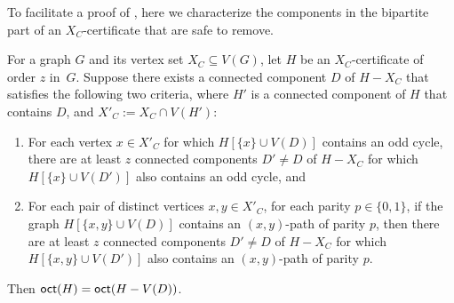 To facilitate a proof of , here we characterize the components in the bipartite part of an $X_C$-certificate that are safe to remove.

\begin{lemma}\label{lem:redundant-component}
  For a graph $G$ and its vertex set $X_C \subseteq V(G)$,
  let $H$ be an $X_C$-certificate of order $z$ in~$G$.
  Suppose there exists a connected component $D$ of $H - X_C$ that satisfies the following two criteria,
  where $H'$ is a connected component of $H$ that contains $D$, and $X'_C := X_C \cap V(H')$:
%
  \begin{enumerate}[(1)]
    \item For each vertex $x \in X'_C$ for which $H[\{x\} \cup V(D)]$ contains an odd cycle,
    there are at least $z$ connected components $D' \neq D$ of $H-X_C$ for which
    $H[\{x\} \cup V(D')]$ also contains an odd cycle, and 
    \item For each pair of distinct vertices $x,y \in X'_C$, for each parity $p \in \{0,1\}$,
    if the graph $H[\{x,y\} \cup V(D)]$ contains an $(x,y)$-path of parity $p$,
    then there are at least $z$ connected components $D' \neq D$ of $H-X_C$ for which
    $H[\{x,y\} \cup V(D')]$ also contains an $(x,y)$-path of parity $p$.
  \end{enumerate}
%
  Then $\textnormal{\textsf{oct}}(H) = \textnormal{\textsf{oct}}(H - V(D))$.
\end{lemma}

